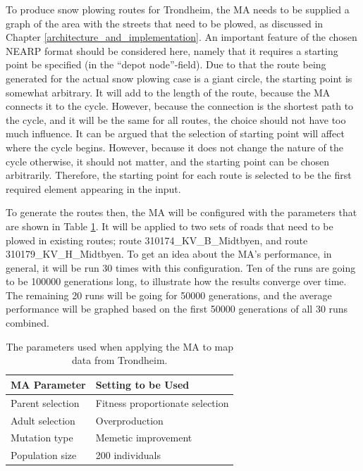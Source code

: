 To produce snow plowing routes for Trondheim, the MA needs to be supplied a graph of the area with the streets that need to be plowed, as discussed in Chapter \ref{architecture_and_implementation}. An important feature of the chosen NEARP format should be considered here, namely that it requires a starting point be specified (in the \enquote{depot node}-field). Due to that the route being generated for the actual snow plowing case is a giant circle, the starting point is somewhat arbitrary. It will add to the length of the route, because the MA connects it to the cycle. However, because the connection is the shortest path to the cycle, and it will be the same for all routes, the choice should not have too much influence. It can be argued that the selection of starting point will affect where the cycle begins. However, because it does not change the nature of the cycle otherwise, it should not matter, and the starting point can be chosen arbitrarily. Therefore, the starting point for each route is selected to be the first required element appearing in the input.

To generate the routes then, the MA will be configured with the parameters that are shown in Table \ref{tab:trondheim_params_table}. It will be applied to two sets of roads that need to be plowed in existing routes; route 310174\_KV\_B\_Midtbyen, and route 310179\_KV\_H\_Midtbyen. To get an idea about the MA's performance, in general, it will be run 30 times with this configuration. Ten of the runs are going to be 100000 generations long, to illustrate how the results converge over time. The remaining 20 runs will be going for 50000 generations, and the average performance will be graphed based on the first 50000 generations of all 30 runs combined.

{
\begin{table}[tbph]
\centering
\begin{tabular}{ll}
\toprule
\textbf{MA Parameter} & \textbf{Setting to be Used}     \\ \midrule
Parent selection      & Fitness proportionate selection \\
Adult selection       & Overproduction                  \\
Mutation type         & Memetic improvement             \\
Population size       & 200 individuals                 \\ \bottomrule
\end{tabular}
\caption{The parameters used when applying the MA to map data from Trondheim.}
\label{tab:trondheim_params_table}
\end{table}
}

